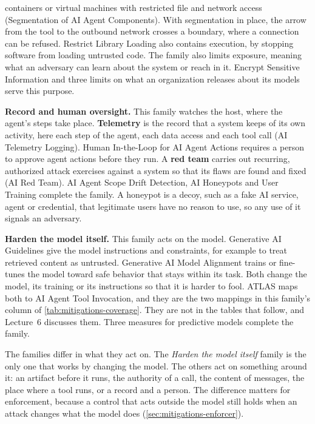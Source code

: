 containers or virtual machines with restricted file and network access (Segmentation of AI Agent
Components). With segmentation in place, the arrow from the tool to the outbound network crosses a
boundary, where a connection can be refused. Restrict Library Loading also contains execution, by
stopping software from loading untrusted code. The family also limits exposure, meaning what an
adversary can learn about the system or reach in it. Encrypt Sensitive Information and three limits
on what an organization releases about its models serve this purpose.
\item \textbf{Record and human oversight.} This family watches the host, where the agent's steps
take place. \textbf{Telemetry} is the record that a system keeps of its own activity, here each
step of the agent, each data access and each tool call (AI Telemetry Logging). Human In-the-Loop
for AI Agent Actions requires a person to approve agent actions before they run. A \textbf{red
team} carries out recurring, authorized attack exercises against a system so that its flaws
are found and fixed (AI Red Team). AI Agent Scope Drift Detection, AI Honeypots and User Training
complete the family. A honeypot is a decoy, such as a fake AI service, agent or credential, that
legitimate users have no reason to use, so any use of it signals an adversary.
\item \textbf{Harden the model itself.} This family acts on the model. Generative AI Guidelines
give the model instructions and constraints, for example to treat retrieved content as untrusted.
Generative AI Model Alignment trains or fine-tunes the model toward safe behavior that stays within
its task. Both change the model, its training or its instructions so that it is harder to fool.
ATLAS maps both to AI Agent Tool Invocation, and they are the two mappings in this family's column
of \cref{tab:mitigations-coverage}. They are not in the tables that follow, and Lecture~6 discusses
them. Three measures for predictive models complete the family.
\ei

The families differ in what they act on. The \emph{Harden the model itself} family is the only one
that works by changing the model. The others act on something around it: an artifact before it
runs, the authority of a call, the content of messages, the place where a tool runs, or a record
and a person. The difference matters for enforcement, because a control that acts outside the model
still holds when an attack changes what the model does (\cref{sec:mitigations-enforcer}).

